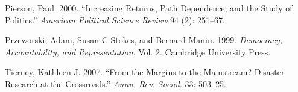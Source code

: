 \documentclass[]{article}
\begin{document}
\leavevmode\hypertarget{ref-pierson2000increasing}{}%
Pierson, Paul. 2000. ``Increasing Returns, Path Dependence, and the Study of Politics.'' \emph{American Political Science Review} 94 (2): 251--67.

\leavevmode\hypertarget{ref-przeworski1999democracy}{}%
Przeworski, Adam, Susan C Stokes, and Bernard Manin. 1999. \emph{Democracy, Accountability, and Representation}. Vol. 2. Cambridge University Press.

\leavevmode\hypertarget{ref-tierney2007margins}{}%
Tierney, Kathleen J. 2007. ``From the Margins to the Mainstream? Disaster Research at the Crossroads.'' \emph{Annu. Rev. Sociol.} 33: 503--25.
\end{document}
